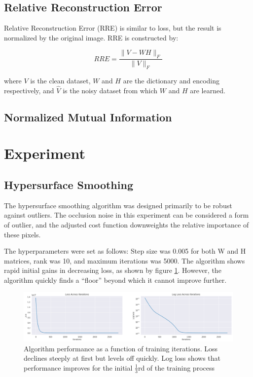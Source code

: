 \documentclass{article} %
\begin{document}
\subsection{Relative Reconstruction Error}
Relative Reconstruction Error (RRE) is similar to loss, but the result is normalized by the original image. RRE is constructed by:

\[RRE = \frac{\|V - WH\|_F}{\|V\|_F}\]

where $V$ is the clean dataset, $W$ and $H$ are the dictionary and encoding respectively, and $\hat{V}$ is the noisy dataset from which $W$ and $H$ are learned.\\

\subsection{Normalized Mutual Information}



\section{Experiment}

\subsection{Hypersurface Smoothing}

The hypersurface smoothing algorithm was designed primarily to be robust against outliers. The occlusion noise in this experiment can be considered a form of outlier, and the adjusted cost function downweights the relative importance of these pixels.

The hyperparameters were set as follows: Step size was 0.005 for both W and H matrices, rank was 10, and maximum iterations was 5000. The algorithm shows rapid initial gains in decreasing loss, as shown by figure \ref{figure:hypersurface_logloss}. However, the algorithm quickly finds a ``floor'' beyond which it cannot improve further. 

\begin{figure}[h]
  \includegraphics[width=\textwidth]{hypersurface_logloss}
  \caption{Algorithm performance as a function of training iterations. Loss declines steeply at first but levels off quickly. Log loss shows that performance improves for the initial $\frac{1}{3}$rd of the training process}
  \label{figure:hypersurface_logloss}
\end{figure}
\end{document}
